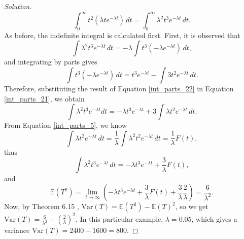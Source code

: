 \documentclass[letterpaper, 10 pt, conference]{article}
\newcommand\E{\ensuremath{\mathbb{E}}}
\newcommand\V{\ensuremath{\mathrm{Var}}}
\begin{document}
\begin{proof}[Solution]
	\begin{equation}
		\int_{0}^{\infty} t^2(\lambda t e^{-\lambda t}) \, dt = \int_{0}^{\infty} \lambda^2 t^3 e^{-\lambda t} \, dt.
	\end{equation}
	As before, the indefinite integral is calculated first. First, it is observed that
	\begin{equation}\label{int_parts_21}
		 \int \lambda^2 t^3 e^{-\lambda t} \, dt = -\lambda \int t^3 (-\lambda e^{-\lambda t} )\, dt,
	\end{equation}
	and integrating by parts gives
	\begin{equation}\label{int_parts_22}
		\int t^3 (-\lambda e^{-\lambda t} )\, dt = t^3 e^{-\lambda t} - \int 3 t^2 e^{-\lambda t} \, dt.
	\end{equation}
	Therefore, substituting the result of Equation \ref{int_parts_22} in Equation \ref{int_parts_21}, we obtain
	\begin{equation}\label{int_parts_23}
		\int \lambda^2 t^3 e^{-\lambda t} dt = -\lambda t^3 e^{-\lambda t} + 3 \int \lambda t^2 e^{-\lambda t} \, dt.
	\end{equation}
 	From Equation \ref{int_parts_5}, we know
	\begin{equation}
		\int \lambda t^2 e^{-\lambda t} \, dt = \frac{1}{\lambda} \int \lambda^2 t^2 e^{-\lambda t} \, dt =  \frac{1}{\lambda} F(t),
	\end{equation}
	thus
	\begin{equation}
		\int \lambda^2 t^3 e^{-\lambda t} \, dt = -\lambda t^3 e^{-\lambda t} + \frac{3}{\lambda} F(t), 
	\end{equation}
	and
	\begin{equation}
		\E(T^2) = \lim_{t \longrightarrow \infty} (-\lambda t^3 e^{-\lambda t} + \frac{3}{\lambda} F(t) + \frac{3}{\lambda} \frac{2}{\lambda}) = \frac{6}{\lambda^2}.
	\end{equation} 
	Now, by Theorem 6.15 \citep{snell}, $\V(T) = \E(T^2) - \E(T)^2$, so we get $\V(T) = \frac{6}{\lambda^2} - (\frac{2}{\lambda})^2$. In this particular example, $\lambda = 0.05$, which gives a variance $\V(T) = 2400-1600=800$.
\end{proof}
\end{document}
